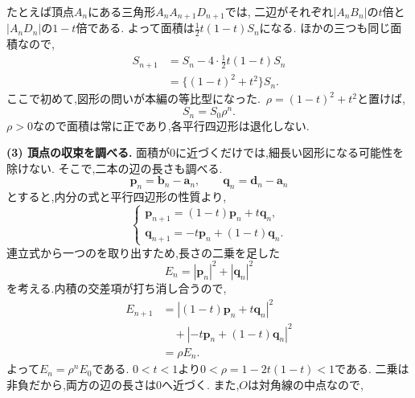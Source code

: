 \begin{enumerate}[label=\textbf{問\arabic*.},leftmargin=3.8em,format=\bookitemlink{practice-entrance}{solution}{problem}]
                たとえば頂点$A_n$にある三角形$A_nA_{n+1}D_{n+1}$では,
                二辺がそれぞれ$|A_nB_n|$の$t$倍と$|A_nD_n|$の$1-t$倍である.
                よって面積は$\frac12t(1-t)S_n$になる.
                ほかの三つも同じ面積なので,
                \[
                 \begin{aligned}
                 S_{n+1}
                 &=S_n-4\cdot\frac12t(1-t)S_n\\
                 &=\{(1-t)^2+t^2\}S_n.
                 \end{aligned}
                \]
                ここで初めて,図形の問いが本編の等比型になった.
                \,$\rho=(1-t)^2+t^2$と置けば,
                \[
                 S_n=S_0\rho^n.
                \]
                $\rho>0$なので面積は常に正であり,各平行四辺形は退化しない.
                \par\noindent
                \textbf{(3) 頂点の収束を調べる.}
                面積が$0$に近づくだけでは,細長い図形になる可能性を除けない.
                そこで,二本の辺の長さも調べる.
                \[
                 \boldsymbol p_n=\boldsymbol b_n-\boldsymbol a_n,
                 \qquad
                 \boldsymbol q_n=\boldsymbol d_n-\boldsymbol a_n
                \]
                とすると,内分の式と平行四辺形の性質より,
                \[
                 \begin{cases}
                 \boldsymbol p_{n+1}=(1-t)\boldsymbol p_n+t\boldsymbol q_n,\\
                 \boldsymbol q_{n+1}=-t\boldsymbol p_n+(1-t)\boldsymbol q_n.
                 \end{cases}
                \]
                連立式から一つのを取り出すため,長さの二乗を足した
                \[
                 E_n=|\boldsymbol p_n|^2+|\boldsymbol q_n|^2
                \]
                を考える.内積の交差項が打ち消し合うので,
                \[
                 \begin{aligned}
                 E_{n+1}
                 &=|(1-t)\boldsymbol p_n+t\boldsymbol q_n|^2\\
                 &\quad+|-t\boldsymbol p_n+(1-t)\boldsymbol q_n|^2\\
                 &=\rho E_n.
                 \end{aligned}
                \]
                よって$E_n=\rho^nE_0$である.
                $0<t<1$より$0<\rho=1-2t(1-t)<1$である.
                二乗は非負だから,両方の辺の長さは$0$へ近づく.
                また,$O$は対角線の中点なので,

\end{enumerate}
